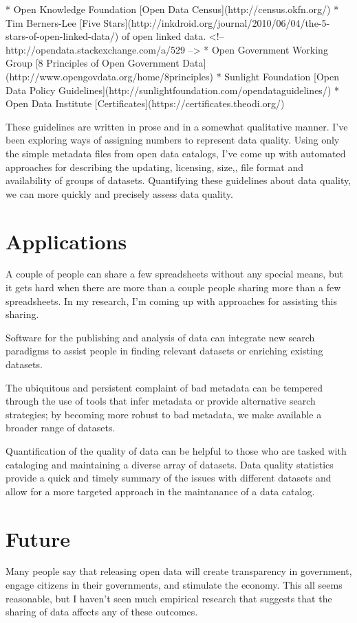 \documentclass{acm_proc_article-sp}
\begin{document}
* Open Knowledge Foundation [Open Data Census](http://census.okfn.org/)
* Tim Berners-Lee [Five Stars](http://inkdroid.org/journal/2010/06/04/the-5-stars-of-open-linked-data/) of open linked data.
    <!-- http://opendata.stackexchange.com/a/529 -->
* Open Government Working Group [8 Principles of Open Government Data](http://www.opengovdata.org/home/8principles)
* Sunlight Foundation [Open Data Policy Guidelines](http://sunlightfoundation.com/opendataguidelines/)
* Open Data Institute [Certificates](https://certificates.theodi.org/)

These guidelines are written in prose and in a somewhat qualitative manner.
I've been exploring ways of assigning numbers to represent data quality.
Using only the simple metadata files from open data catalogs, I've come up
with automated approaches for describing the updating,\cite{updatdness}
licensing,\cite{licensing} size,\cite{summary}, file format\cite{file-formats}
and availability\cite{dead}\cite{zombie} of groups of datasets.
Quantifying these guidelines about data quality, we can more quickly and
precisely assess data quality.

\section{Applications}
A couple of people can share a few spreadsheets without any special means,
but it gets hard when there are more than a couple people sharing more than
a few spreadsheets. In my research, I'm coming up with approaches for assisting
this sharing.

Software for the publishing and analysis of data can integrate new search
paradigms to assist people in finding relevant datasets or enriching existing
datasets.

The ubiquitous and persistent complaint of bad metadata can be tempered through
the use of tools that infer metadata or provide alternative search strategies;
by becoming more robust to bad metadata, we make available a broader range of
datasets.

Quantification of the quality of data can be helpful to those who are tasked
with cataloging and maintaining a diverse array of datasets. Data quality
statistics provide a quick and timely summary of the issues with different
datasets and allow for a more targeted approach in the maintanance of a
data catalog.

\section{Future}
Many people say that releasing open data will create transparency in government,
engage citizens in their governments, and stimulate the economy. This all seems
reasonable, but I haven't seen much empirical research that suggests that the
sharing of data affects any of these outcomes.
\end{document}
